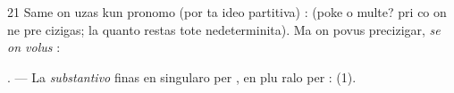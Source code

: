 \begin{VUpage}[25]{21}
\VUblancAlinea
Same on uzas  kun pronomo (por ta ideo partitiva) :\nl
{} (poke o multe? pri co on ne pre\cc
cizigas; la quanto restas tote nedeterminita). Ma on povus\nl
precizigar, \textit{se on volus} : 

\VUblancAlinea
\VUsaut{6.47mm}
\VUsaut{4.10mm}

. --- La \textit{substantivo} finas en singularo per , en plu\cc
ralo per  :  (1).
\end{VUpage}

